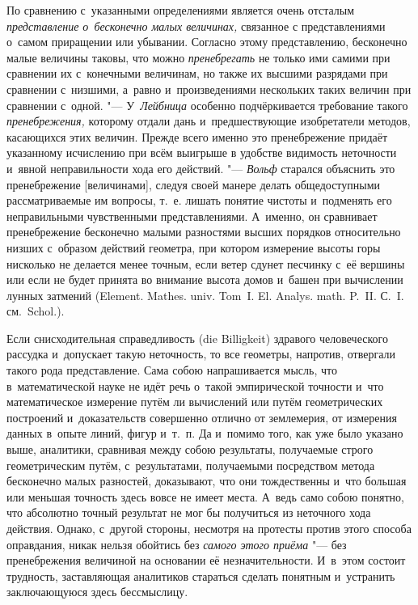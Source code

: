 По сравнению с~указанными определениями является очень отсталым
{\em представление о~бесконечно малых величинах,} связанное
с представлениями о~самом приращении или убывании. Согласно этому представлению,
бесконечно малые величины таковы, что можно
{\em пренебрегать} не только ими самими при сравнении их с~конечными величинам, но
также их высшими разрядами при сравнении с~низшими, а~равно и~произведениями
нескольких таких величин при сравнении с~одной. "--- У~{\em Лейбница} особенно
подчёркивается требование такого {\em пренебрежения,} которому отдали
дань и~предшествующие изобретатели методов, касающихся этих величин. Прежде всего
именно это пренебрежение придаёт указанному исчислению при всём выигрыше в
удобстве видимость неточности и~явной неправильности хода его действий. "---
{\em Вольф} старался объяснить это пренебрежение [величинами], следуя своей
манере делать общедоступными рассматриваемые им вопросы, т.~е. лишать
понятие чистоты и~подменять его неправильными чувственными
представлениями. А~именно, он сравнивает пренебрежение бесконечно малыми
разностями высших порядков относительно низших с~образом действий геометра,
при котором измерение высоты горы нисколько не делается менее точным, если ветер
сдунет песчинку с~её вершины или если не будет принята во внимание высота домов и~башен при
вычислении лунных затмений (Ele\-ment. Mathes. univ. Tom~I. El. Ana\-lys.
math. P.~II. С.~I. см.~Schol.).

Если снисходительная справедливость (die Billig\-keit) здравого человеческого
рассудка и~допускает такую неточность, то все геометры, напротив, отвергали
такого рода представление. Сама собою напрашивается мысль, что в~математической
науке не идёт речь о~такой эмпирической точности и~что математическое измерение
путём ли вычислений или путём геометрических построений и~доказательств
совершенно отлично от землемерия, от измерения данных в~опыте линий, фигур
и~т.~п. Да и~помимо того, как уже было указано выше, аналитики, сравнивая между
собою результаты, получаемые строго геометрическим путём, с~результатами,
получаемыми посредством метода бесконечно малых разностей, доказывают, что они
тождественны и~что большая или меньшая точность здесь вовсе не имеет места.
А~ведь само собою понятно, что абсолютно точный результат не мог бы получиться
из неточного хода действия. Однако, с~другой стороны, несмотря на протесты
против этого способа оправдания, никак нельзя обойтись без
{\em самого этого приёма} "--- без пренебрежения величиной на основании её
незначительности. И~в~этом состоит трудность, заставляющая аналитиков стараться
сделать понятным и~устранить заключающуюся здесь бессмыслицу.


